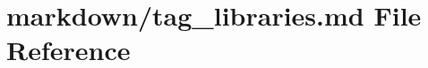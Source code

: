 \hypertarget{tag__libraries_8md}{}\section{markdown/tag\+\_\+libraries.md File Reference}
\label{tag__libraries_8md}
